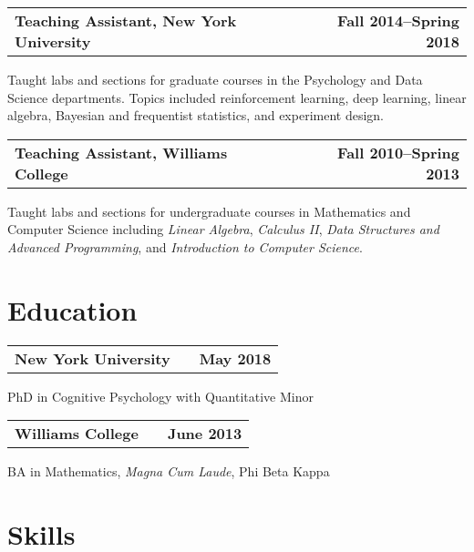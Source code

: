 \documentclass[10pt]{my_cv}
\begin{document}
\begin{addmargin}[1em]{0em}
\begin{tabular}{@{} L M R}
  \textbf{Teaching Assistant, New York University}& &\textbf{Fall 2014--Spring 2018}\\
\end{tabular}\vspace{-1em}
  Taught labs and sections for graduate courses in the Psychology and
  Data Science departments. Topics included reinforcement learning, deep learning, linear algebra, Bayesian
  and frequentist statistics, and experiment design.

\begin{tabular}{@{} L M R}
  \textbf{Teaching Assistant, Williams College}& &\textbf{Fall 2010--Spring 2013}\\
\end{tabular}\vspace{-1em}
  Taught labs and sections for undergraduate courses in Mathematics and Computer Science
  including \emph{Linear Algebra}, \emph{Calculus II}, \emph{Data Structures and Advanced
  Programming}, and \emph{Introduction to Computer Science}.

\end{addmargin}

\section{Education}

\hrulefill

\begin{addmargin}[1em]{0em}

\begin{tabular}{@{} L M R}
  \textbf{New York University}& &\textbf{May 2018}\\
\end{tabular}\vspace{-1em}
  PhD in Cognitive Psychology with Quantitative Minor

\begin{tabular}{@{} L M R}
  \textbf{Williams College}& &\textbf{June 2013}\\
\end{tabular}\vspace{-1em}
  BA in Mathematics, \emph{Magna Cum Laude}, Phi Beta Kappa

\end{addmargin}

\section{Skills}
\end{document}
